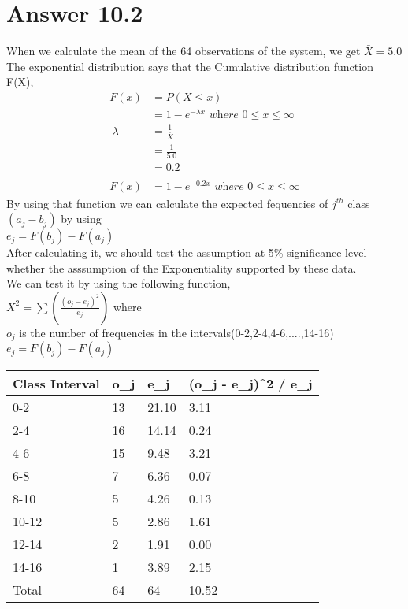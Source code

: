 \documentclass[11pt]{article}
\begin{document}
\section*{Answer 10.2}
When we calculate the mean of the 64 observations of the system, we get $\bar{X} = 5.0$ \\
The exponential distribution says that the Cumulative distribution function F(X),\\
\begin{align*}
F(x) &= P(X \leq x) \\
&= 1 - e^{-\lambda x} \textit{     where } 0 \leq x \leq \infty \\\
\lambda &= \frac{1}{\bar{X}} \\
&= \frac{1}{5.0} \\
&= 0.2
\\
\\
F(x) &= 1 - e^{-0.2x} \textit{     where } 0 \leq x \leq \infty
\end{align*}
By using that function we can calculate the expected fequencies of $j^{th}$ class $(a_j - b_j)$ by using \\
$e_j = F(b_j) - F(a_j)$ \\
After calculating it, we should test the assumption at 5\% significance level whether the asssumption of the Exponentiality supported by these data. \\
We can test it by using the following function,\\
$X^2 = \sum (\frac{(o_j - e_ j)^2}{e_j})$ where\\ $o_j$ is the number of frequencies in the intervals(0-2,2-4,4-6,....,14-16)\\
$e_j = F(b_j) - F(a_j)$ \\
\begin{table}[H]
\centering
\begin{tabular}{|l|l|l|l|}
\hline
Class Interval & o\_j & e\_j  & (o\_j - e\_j)\textasciicircum{}2 / e\_j \\ \hline
0-2            & 13   & 21.10 & 3.11                                    \\ \hline
2-4            & 16   & 14.14 & 0.24                                    \\ \hline
4-6            & 15   & 9.48  & 3.21                                    \\ \hline
6-8            & 7    & 6.36  & 0.07                                    \\ \hline
8-10           & 5    & 4.26  & 0.13                                    \\ \hline
10-12          & 5    & 2.86  & 1.61                                    \\ \hline
12-14          & 2    & 1.91  & 0.00                                    \\ \hline
14-16          & 1    & 3.89  & 2.15                                    \\ \hline
Total          & 64   & 64    & 10.52                                   \\ \hline
\end{tabular}
\end{table}
\end{document}
